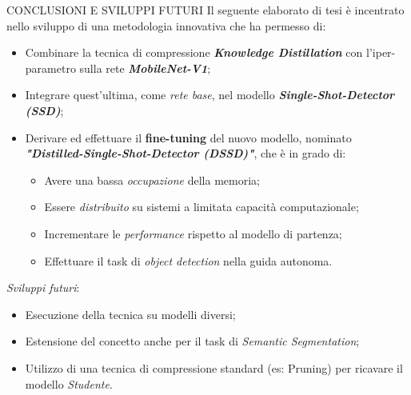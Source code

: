 \begin{frame}{CONCLUSIONI E SVILUPPI FUTURI}
    Il seguente elaborato di tesi è incentrato nello sviluppo di una metodologia innovativa che ha permesso di:
    \begin{itemize}
        \item Combinare la tecnica di compressione {\bfseries{\emph{Knowledge Distillation}}} con l'iper-parametro \boldsymbol{$\alpha$} sulla rete {\bfseries{\emph{MobileNet-V1}}};
        \item Integrare quest'ultima, come \emph{rete base}, nel modello {\bfseries{\emph{Single-Shot-Detector (SSD)}}};
        \item Derivare ed effettuare il {\bfseries{fine-tuning}} del nuovo modello, nominato {\bfseries{\emph{"Distilled-Single-Shot-Detector (DSSD)"}}}, che è in grado di:
        \begin{itemize}
            \item Avere una bassa \emph{occupazione} della memoria;
            \item Essere \emph{distribuito} su sistemi a limitata capacità computazionale;
            \item Incrementare le \emph{performance} rispetto al modello di partenza;
            \item Effettuare il task di \emph{object detection} nella guida autonoma.
        \end{itemize}
    \end{itemize}
    \vspace{0.3cm}
    \emph{Sviluppi futuri}:
    \begin{itemize}
        \item Esecuzione della tecnica su modelli diversi;
        \item Estensione del concetto anche per il task di \emph{Semantic Segmentation};
        \item Utilizzo di una tecnica di compressione standard (es: Pruning) per ricavare il modello \emph{Studente}.
    \end{itemize}
\end{frame}